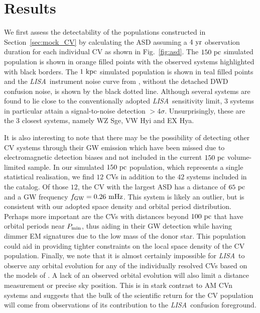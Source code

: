 \documentclass[fleqn,usenatbib]{mnras}
\newcommand{\lisa}{{\it LISA}}
\begin{document}
\section{Results}
We first assess the detectability of the populations constructed in Section~\ref{sec:mock_CV} by calculating the ASD assuming a $4~\rm{yr}$ observation duration for each individual CV as shown in Fig.~\ref{fig:asd}. The $150~\rm{pc}$ simulated population is shown in orange filled points with the observed \citet{pala20} systems highlighted with black borders. The $1~\rm{kpc}$ simulated population is shown in teal filled points and the \lisa\ instrument noise curve from \citet{Robson2019}, without the detached DWD confusion noise, is shown by the black dotted line. Although several systems are found to lie close to the conventionally adopted \lisa\ sensitivity limit, 3 systems in particular attain a signal-to-noise detection $>4\sigma$. Unsurprisingly, these are the 3 closest systems, namely WZ Sge, VW Hyi and EX Hya. 

It is also interesting to note that there may be the possibility of detecting other CV systems through their GW emission which have been missed due to electromagnetic detection biases and not included in the current $150~\rm{pc}$ volume-limited sample. In our simulated $150~\rm{pc}$ population, which represents a single statistical realisation, we find $12$ CVs in addition to the $42$ systems included in the \citet{pala20} catalog. Of those $12$, the CV with the largest ASD has a distance of $65~\rm{pc}$ and a GW frequency $f_{\rm{GW}} = 0.26~\rm{mHz}$. This system is likely an outlier, but is consistent with our adopted space density and orbital period distribution. Perhaps more important are the CVs with distances beyond $100~\rm{pc}$ that have orbital periods near $P_{\rm{min}}$, thus aiding in their GW detection while having dimmer EM signatures due to the low mass of the donor star. This population could aid in providing tighter constraints on the local space density of the CV population. Finally, we note that it is almost certainly impossible for \lisa\ to observe any orbital evolution for any of the individually resolved CVs based on the models of \citet{knigge11}. A lack of an observed orbital evolution will also limit a distance measurement or precise sky position. This is in stark contrast to AM CVn systems \citep[e.g.][]{Nelemans2004, Kremer2017, Breivik2018} and suggests that the bulk of the scientific return for the CV population will come from observations of its contribution to the \lisa\ confusion foreground. 
\end{document}
